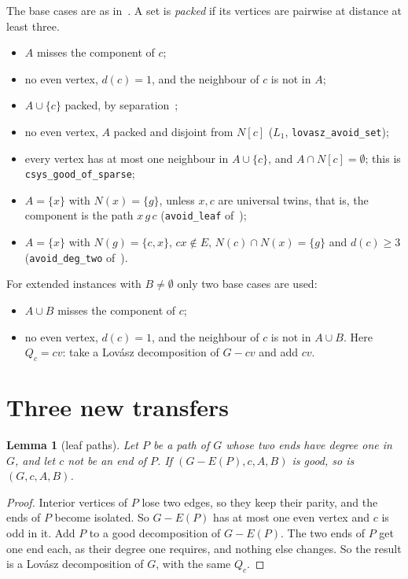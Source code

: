 \documentclass[11pt]{amsart}
\newtheorem{lemma}[theorem]{Lemma}
\theoremstyle{definition}
\begin{document}
The base cases are as in~\cite{L1I,DL}. A set is \emph{packed} if its vertices are pairwise at
distance at least three.
\begin{itemize}
\item $A$ misses the component of $c$;
\item no even vertex, $d(c)=1$, and the neighbour of $c$ is not in $A$;
\item $A\cup\{c\}$ packed, by separation~\cite[Thm.~6.1]{RD};
\item no even vertex, $A$ packed and disjoint from $N[c]$ ($L_1$, \texttt{lovasz\_avoid\_set});
\item every vertex has at most one neighbour in $A\cup\{c\}$, and $A\cap N[c]=\emptyset$; this
is \texttt{csys\_good\_of\_sparse};
\item $A=\{x\}$ with $N(x)=\{g\}$, unless $x,c$ are universal twins, that is, the component is
the path $x\,g\,c$ (\texttt{avoid\_leaf} of~\cite{DL});
\item $A=\{x\}$ with $N(g)=\{c,x\}$, $cx\notin E$, $N(c)\cap N(x)=\{g\}$ and $d(c)\ge3$
(\texttt{avoid\_deg\_two} of~\cite{DL}).
\end{itemize}
For extended instances with $B\ne\emptyset$ only two base cases are used:
\begin{itemize}
\item $A\cup B$ misses the component of $c$;
\item no even vertex, $d(c)=1$, and the neighbour of $c$ is not in $A\cup B$. Here $Q_c=cv$: take
a Lov\'asz decomposition of $G-cv$ and add $cv$.
\end{itemize}

\section{Three new transfers}\label{sec:moves}

\begin{lemma}[leaf paths]\label{lem:leafpath}
Let $P$ be a path of $G$ whose two ends have degree one in $G$, and let $c$ not be an end of $P$.
If $(G-E(P),c,A,B)$ is good, so is $(G,c,A,B)$.
\end{lemma}

\begin{proof}
Interior vertices of $P$ lose two edges, so they keep their parity, and the ends of $P$ become
isolated. So $G-E(P)$ has at most one even vertex and $c$ is odd in it. Add $P$ to a good
decomposition of $G-E(P)$. The two ends of $P$ get one end each, as their degree one requires, and
nothing else changes. So the result is a Lov\'asz decomposition of $G$, with the same $Q_c$.
\end{proof}
\end{document}
